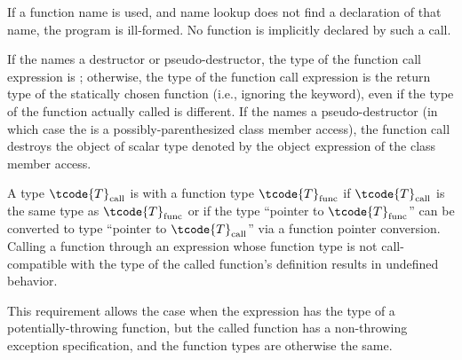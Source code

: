 \pnum
\begin{note}
If a function name is used, and name
lookup does not find a declaration of that name,
the program is ill-formed. No function is implicitly declared by such a
call.
\end{note}

\pnum
If the  names
a destructor or pseudo-destructor,
the type of the function call expression is ; otherwise, the
type of the function call expression is the return type of the
statically chosen function (i.e., ignoring the  keyword),
even if the type of the function actually called is different.
%
If the  names a pseudo-destructor
(in which case the 
is a possibly-parenthesized class member access),
the function call destroys
the object of scalar type
denoted by the object expression
of the class member access.

\pnum
A type $\tcode{T}_\text{call}$ is
 with a function type $\tcode{T}_\text{func}$
if $\tcode{T}_\text{call}$ is the same type as $\tcode{T}_\text{func}$ or
if the type ``pointer to $\tcode{T}_\text{func}$'' can be
converted to type ``pointer to $\tcode{T}_\text{call}$''
via a function pointer conversion.
Calling a function through an
expression whose function type
is not call-compatible with the
type of the called function's
definition results in undefined behavior.
\begin{note}
This requirement allows the case
when the expression has the type of a
potentially-throwing function, but the called function has
a non-throwing exception specification,
and the function types are otherwise the same.
\end{note}

